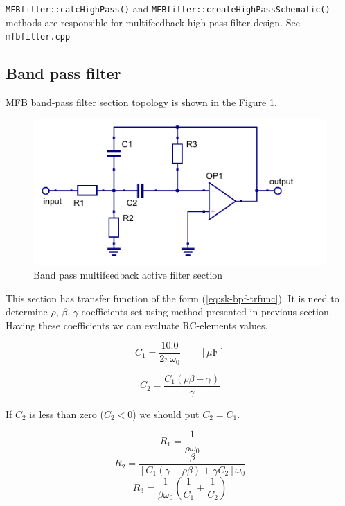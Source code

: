 \verb|MFBfilter::calcHighPass()| and \verb|MFBfilter::createHighPassSchematic()|
methods are responsible for multifeedback high-pass filter design. See
\verb|mfbfilter.cpp|

\subsection{Band pass filter}

MFB band-pass filter section topology is shown in the Figure \ref{fig:mfb-bpf}.

\begin{figure}[!ht]
  \centering
  \includegraphics[width=0.6\linewidth]{pics/mfb-bpf}
  \caption{Band pass multifeedback active filter section}
  \label{fig:mfb-bpf}
\end{figure}

This section has transfer function of the form (\ref{eq:sk-bpf-trfunc}). It is 
need to determine $\rho$, $\beta$, $\gamma$ coefficients set using method 
presented in previous section. Having these coefficients we can evaluate 
RC-elements values. 

\begin{equation}
 C_1=\frac{10.0}{2\pi\omega_0}\qquad[\mu\mbox{F}]
\end{equation}

\begin{equation}
 C_2 = \frac{C_1(\rho\beta-\gamma)}{\gamma}
\end{equation}

If $C_2$ is less than zero ($C_2<0$) we should put $C_2=C_1$.

\begin{equation}
 R_1 = \frac{1}{\rho\omega_0}
\end{equation}
\begin{equation}
 R_2=\frac{\beta}{[C_1(\gamma-\rho\beta)+\gamma C_2]\omega_0}
\end{equation}
\begin{equation}
 R_3=\frac{1}{\beta\omega_0}\left(\frac{1}{C_1}+\frac{1}{C_2}\right)
\end{equation}

